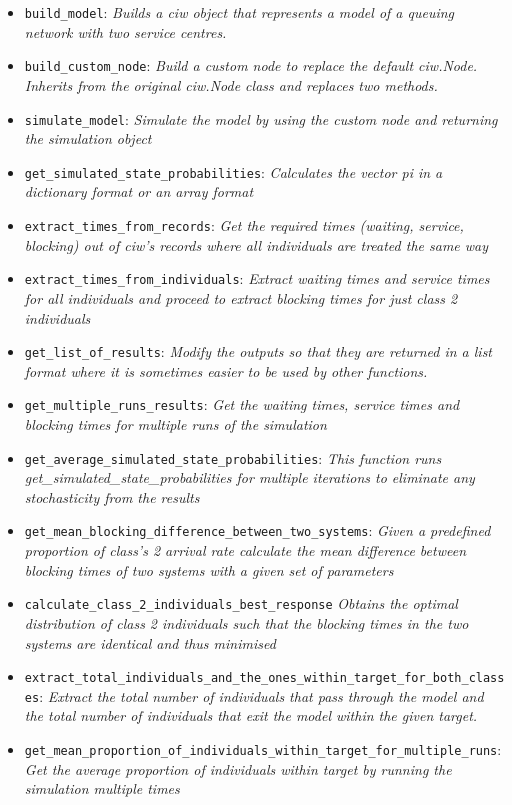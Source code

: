 \begin{itemize}
    \item \lstinline[style=pystyle]{build_model}: \textit{Builds a ciw object 
    that represents a model of a queuing network with two service centres.}
    \item \lstinline[style=pystyle]{build_custom_node}: \textit{Build a custom 
    node to replace the default ciw.Node. Inherits from the original ciw.Node 
    class and replaces two methods.}
    \item \lstinline[style=pystyle]{simulate_model}: \textit{Simulate the model
    by using the custom node and returning the simulation object}
    \item \lstinline[style=pystyle]{get_simulated_state_probabilities}: \textit{
    Calculates the vector pi in a dictionary format or an array format}
    \item \lstinline[style=pystyle]{extract_times_from_records}: \textit{Get the
    required times (waiting, service, blocking) out of ciw's records where all 
    individuals are treated the same way}
    \item \lstinline[style=pystyle]{extract_times_from_individuals}: \textit{
    Extract waiting times and service times for all individuals and proceed to 
    extract blocking times for just class 2 individuals}
    \item \lstinline[style=pystyle]{get_list_of_results}: \textit{Modify the 
    outputs so that they are returned in a list format where it is sometimes 
    easier to be used by other functions.}
    \item \lstinline[style=pystyle]{get_multiple_runs_results}: \textit{Get the 
    waiting times, service times and blocking times for multiple runs of the 
    simulation}
    \item \lstinline[style=pystyle]{get_average_simulated_state_probabilities}:
    \textit{This function runs \hfill\break
    get\_simulated\_state\_probabilities for multiple iterations to eliminate 
    any stochasticity from the results}
    \item \lstinline[style=pystyle]
    {get_mean_blocking_difference_between_two_systems}: \textit{Given a 
    predefined proportion of class's 2 arrival rate calculate the mean 
    difference between blocking times of two systems with a given set of 
    parameters}
    \item \lstinline[style=pystyle]{calculate_class_2_individuals_best_response}
    \textit{Obtains the optimal distribution of class 2 individuals such that 
    the blocking times in the two systems are identical and thus minimised}
    \item \lstinline[style=pystyle]
    {extract_total_individuals_and_the_ones_within_target_for_both_classes}:
    \hfill\break \textit{Extract the total number of individuals that pass 
    through the model and the total number of individuals that exit the model 
    within the given target.}
    \item \lstinline[style=pystyle]
    {get_mean_proportion_of_individuals_within_target_for_multiple_runs}: 
    \textit{Get the average proportion of individuals within target by running 
    the simulation multiple times}
\end{itemize}
